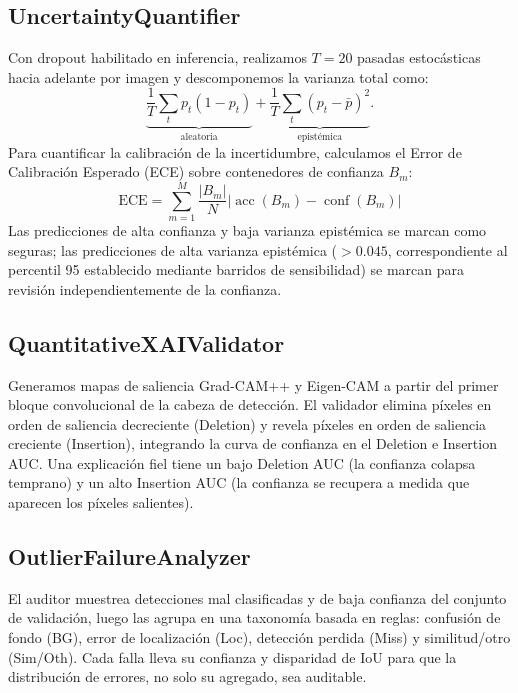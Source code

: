 \documentclass[10pt,twocolumn,letterpaper]{article}
\begin{document}
\subsection{UncertaintyQuantifier}
Con dropout habilitado en inferencia, realizamos $T=20$ pasadas estocásticas hacia adelante por imagen y descomponemos la varianza total como:
\begin{equation}
    \underbrace{\frac{1}{T}\sum_{t} p_t(1-p_t)}_{\text{aleatoria}} + \underbrace{\frac{1}{T}\sum_{t} (p_t - \bar{p})^2}_{\text{epistémica}}.
\end{equation}
Para cuantificar la calibración de la incertidumbre, calculamos el Error de Calibración Esperado (ECE) sobre contenedores de confianza $B_m$:
\begin{equation}
    \text{ECE} = \sum_{m=1}^{M} \frac{|B_m|}{N} \Big| \operatorname{acc}(B_m) - \operatorname{conf}(B_m) \Big|
\end{equation}
Las predicciones de alta confianza y baja varianza epistémica se marcan como seguras; las predicciones de alta varianza epistémica ($> 0.045$, correspondiente al percentil 95 establecido mediante barridos de sensibilidad) se marcan para revisión independientemente de la confianza.

\subsection{QuantitativeXAIValidator}
Generamos mapas de saliencia Grad-CAM++ y Eigen-CAM a partir del primer bloque convolucional de la cabeza de detección. El validador elimina píxeles en orden de saliencia decreciente (Deletion) y revela píxeles en orden de saliencia creciente (Insertion), integrando la curva de confianza en el Deletion e Insertion AUC. Una explicación fiel tiene un bajo Deletion AUC (la confianza colapsa temprano) y un alto Insertion AUC (la confianza se recupera a medida que aparecen los píxeles salientes).

\subsection{OutlierFailureAnalyzer}
El auditor muestrea detecciones mal clasificadas y de baja confianza del conjunto de validación, luego las agrupa en una taxonomía basada en reglas: confusión de fondo (BG), error de localización (Loc), detección perdida (Miss) y similitud/otro (Sim/Oth). Cada falla lleva su confianza y disparidad de IoU para que la distribución de errores, no solo su agregado, sea auditable.
\end{document}
